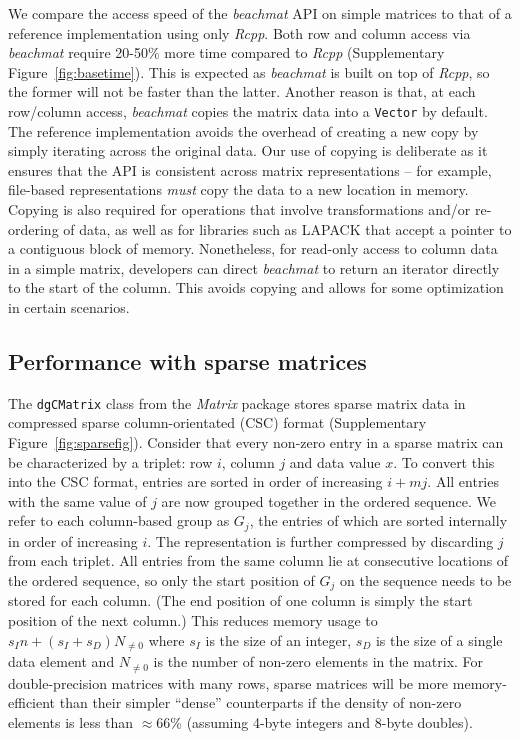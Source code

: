 \documentclass{article}
\newcommand{\beachmat}{\textit{beachmat}}
\newcommand{\code}[1]{\texttt{#1}}
\begin{document}
We compare the access speed of the \beachmat{} API on simple matrices to that of a reference implementation using only \textit{Rcpp}.
Both row and column access via \beachmat{} require 20-50\% more time compared to \textit{Rcpp} (Supplementary Figure~\ref{fig:basetime}).
This is expected as \beachmat{} is built on top of \textit{Rcpp}, so the former will not be faster than the latter.
Another reason is that, at each row/column access, \beachmat{} copies the matrix data into a \code{Vector} by default.
The reference implementation avoids the overhead of creating a new copy by simply iterating across the original data.
Our use of copying is deliberate as it ensures that the API is consistent across matrix representations -- for example, file-based representations \textit{must} copy the data to a new location in memory.
Copying is also required for operations that involve transformations and/or re-ordering of data, as well as for libraries such as LAPACK that accept a pointer to a contiguous block of memory.
Nonetheless, for read-only access to column data in a simple matrix, developers can direct \beachmat{} to return an iterator directly to the start of the column.
This avoids copying and allows for some optimization in certain scenarios.

\subsection{Performance with sparse matrices}
The \code{dgCMatrix} class from the \textit{Matrix} package stores sparse matrix data in compressed sparse column-orientated (CSC) format (Supplementary Figure~\ref{fig:sparsefig}).
Consider that every non-zero entry in a sparse matrix can be characterized by a triplet: row $i$, column $j$ and data value $x$.
To convert this into the CSC format, entries are sorted in order of increasing $i + mj$.
All entries with the same value of $j$ are now grouped together in the ordered sequence.
We refer to each column-based group as $G_j$, the entries of which are sorted internally in order of increasing $i$.
The representation is further compressed by discarding $j$ from each triplet.
All entries from the same column lie at consecutive locations of the ordered sequence, so only the start position of $G_j$ on the sequence needs to be stored for each column.
(The end position of one column is simply the start position of the next column.)
This reduces memory usage to $s_In + (s_I + s_D) N_{\ne 0}$ where $s_I$ is the size of an integer, $s_D$ is the size of a single data element and $N_{\ne 0}$ is the number of non-zero elements in the matrix.
For double-precision matrices with many rows, sparse matrices will be more memory-efficient than their simpler ``dense'' counterparts if the density of non-zero elements is less than $\approx66$\% (assuming 4-byte integers and 8-byte doubles). 
\end{document}
